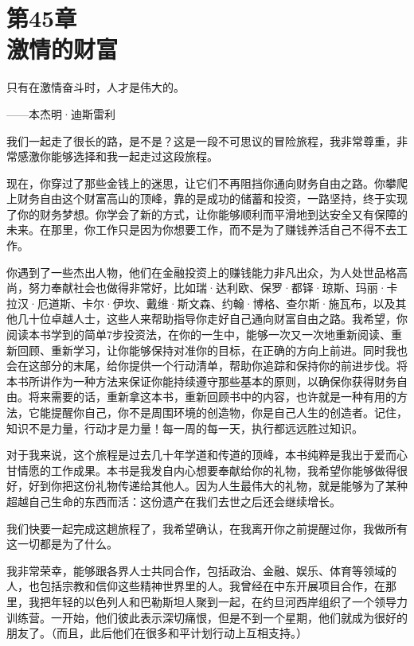 
\section[第45章\q 激情的财富]{第45章\\ 激情的财富}

\begin{BookQuote}
只有在激情奋斗时，人才是伟大的。

\hfill ——本杰明·迪斯雷利
\end{BookQuote}

我们一起走了很长的路，是不是？这是一段不可思议的冒险旅程，我非常尊重，非常感激你能够选择和我一起走过这段旅程。

现在，你穿过了那些金钱上的迷思，让它们不再阻挡你通向财务自由之路。你攀爬上财务自由这个财富高山的顶峰，靠的是成功的储蓄和投资，一路坚持，终于实现了你的财务梦想。你学会了新的方式，让你能够顺利而平滑地到达安全又有保障的未来。在那里，你工作只是因为你想要工作，而不是为了赚钱养活自己不得不去工作。

你遇到了一些杰出人物，他们在金融投资上的赚钱能力非凡出众，为人处世品格高尚，努力奉献社会也做得非常好，比如瑞·达利欧、保罗·都铎·琼斯、玛丽·卡拉汉·厄道斯、卡尔·伊坎、戴维·斯文森、约翰·博格、查尔斯·施瓦布，以及其他几十位卓越人士，这些人来帮助指导你走好自己通向财富自由之路。我希望，你阅读本书学到的简单7步投资法，在你的一生中，能够一次又一次地重新阅读、重新回顾、重新学习，让你能够保持对准你的目标，在正确的方向上前进。同时我也会在这部分的末尾，给你提供一个行动清单，帮助你追踪和保持你的前进步伐。将本书所讲作为一种方法来保证你能持续遵守那些基本的原则，以确保你获得财务自由。将来需要的话，重新拿这本书，重新回顾书中的内容，也许就是一种有用的方法，它能提醒你自己，你不是周围环境的创造物，你是自己人生的创造者。记住，知识不是力量，行动才是力量！每一周的每一天，执行都远远胜过知识。

对于我来说，这个旅程是过去几十年学道和传道的顶峰，本书纯粹是我出于爱而心甘情愿的工作成果。本书是我发自内心想要奉献给你的礼物，我希望你能够做得很好，好到你把这份礼物传递给其他人。因为人生最伟大的礼物，就是能够为了某种超越自己生命的东西而活：这份遗产在我们去世之后还会继续增长。

我们快要一起完成这趟旅程了，我希望确认，在我离开你之前提醒过你，我做所有这一切都是为了什么。

我非常荣幸，能够跟各界人士共同合作，包括政治、金融、娱乐、体育等领域的人，也包括宗教和信仰这些精神世界里的人。我曾经在中东开展项目合作，在那里，我把年轻的以色列人和巴勒斯坦人聚到一起，在约旦河西岸组织了一个领导力训练营。一开始，他们彼此表示深切痛恨，但是不到一个星期，他们就成为很好的朋友了。（而且，此后他们在很多和平计划行动上互相支持。）

